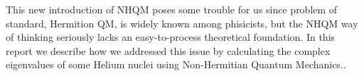 This new introduction of NHQM poses some trouble for us since problem of standard, Hermition QM, is widely known among phisicists, but the NHQM way of thinking seriously lacks an easy-to-process theoretical foundation.
In this report we describe how we addressed this issue by calculating the complex eigenvalues of some Helium nuclei using Non-Hermitian Quantum Mechanics..
